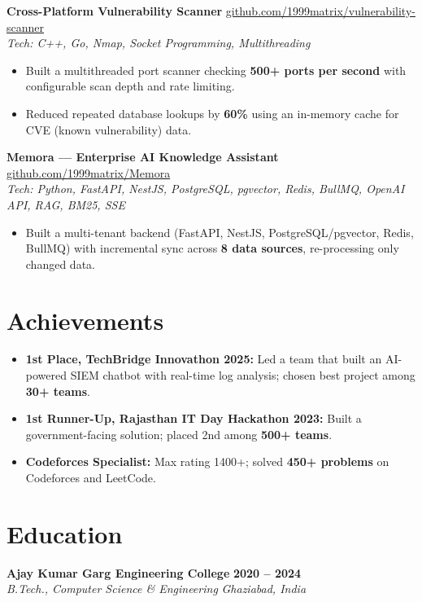 \documentclass[10pt,letterpaper]{article}
\newcommand{\resumeSubheading}[4]{
    \textbf{#1} \hfill \textbf{#2}\\
    \textit{#3} \hfill \textit{#4}

}
\newcommand{\resumeProject}[3]{
    \textbf{#1} \hfill \href{https://#3}{#3} \\
    \textit{Tech: #2}

}
\newcommand{\resumeItem}[1]{
    \item #1
}
\begin{document}
\resumeProject
    {Cross-Platform Vulnerability Scanner}
    {C++, Go, Nmap, Socket Programming, Multithreading}
    {github.com/1999matrix/vulnerability-scanner}

\begin{itemize}
    \resumeItem{Built a multithreaded port scanner checking \textbf{500+ ports per second} with configurable scan depth and rate limiting.}

    \resumeItem{Reduced repeated database lookups by \textbf{60\%} using an in-memory cache for CVE (known vulnerability) data.}
\end{itemize}

\vspace{1pt}

\resumeProject
    {Memora --- Enterprise AI Knowledge Assistant}
    {Python, FastAPI, NestJS, PostgreSQL, pgvector, Redis, BullMQ, OpenAI API, RAG, BM25, SSE}
    {github.com/1999matrix/Memora}

\begin{itemize}
    \resumeItem{Built a multi-tenant backend (FastAPI, NestJS, PostgreSQL/pgvector, Redis, BullMQ) with incremental sync across \textbf{8 data sources}, re-processing only changed data.}
\end{itemize}

\section{Achievements}

\begin{itemize}
    \resumeItem{\textbf{1st Place, TechBridge Innovathon 2025:} Led a team that built an AI-powered SIEM chatbot with real-time log analysis; chosen best project among \textbf{30+ teams}.}

    \resumeItem{\textbf{1st Runner-Up, Rajasthan IT Day Hackathon 2023:} Built a government-facing solution; placed 2nd among \textbf{500+ teams}.}

    \resumeItem{\textbf{Codeforces Specialist:} Max rating 1400+; solved \textbf{450+ problems} on Codeforces and LeetCode.}
\end{itemize}

\section{Education}

\resumeSubheading
    {Ajay Kumar Garg Engineering College}
    {2020 -- 2024}
    {B.Tech., Computer Science \& Engineering}
    {Ghaziabad, India}
\end{document}
